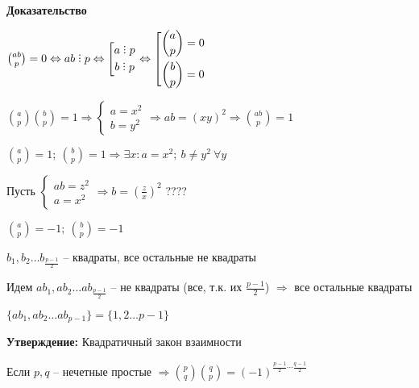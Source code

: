 \documentclass[14pt, letter paper]{article}
\DeclareRobustCommand{\divby}{%
  \mathrel{\text{\vbox{\baselineskip.65ex\lineskiplimit0pt\hbox{.}\hbox{.}\hbox{.}}}}%
}
\begin{document}
\begin{enumerate}
    \begin{center}
        \textbf{Доказательство}
    \end{center}

    ${ab \choose p} = 0 \Leftrightarrow ab \divby p \Leftrightarrow \left[ \begin{gathered}
        a \divby p \\
        b \divby p
    \end{gathered} \right. \Leftrightarrow \left[ \begin{gathered}
        {a \choose p} = 0 \\
        {b \choose p} = 0
    \end{gathered} \right.$

    ${a \choose p}{b \choose p} = 1 \Rightarrow \begin{cases}
        a = x^2 \\
        b = y^2
    \end{cases} \Rightarrow ab = (xy)^2 \Rightarrow {ab \choose p} = 1$

    ${a \choose p} = 1;\ {b \choose p} = 1 \Rightarrow \exists x : a = x^2;\ b \neq y^2\ \forall y$

    Пусть $\begin{cases}
        ab = z^2 \\
        a = x^2
    \end{cases} \Rightarrow b = (\frac{z}{x})^2$ ????

    ${a \choose p} = -1;\ {b \choose p} = -1$

    $b_1, b_2 \ldots b_\frac{p-1}{2}$ -- квадраты, все остальные не квадраты

    Идем $ab_1, ab_2 \ldots ab_\frac{p-1}{2}$ -- не квадраты (все, т.к. их $\frac{p-1}{2}$) $\Rightarrow$ все остальные квадраты

    $\{ab_1, ab_2 \ldots ab_{p-1}\} = \{1, 2 \ldots p-1\}$

    \textbf{Утверждение:} Квадратичный закон взаимности

    Если $p, q$ -- нечетные простые $\Rightarrow {p \choose q}{q \choose p} = (-1)^{\frac{p-1}{2} \cdots \frac{q-1}{2}}$
\end{enumerate}
\end{document}
